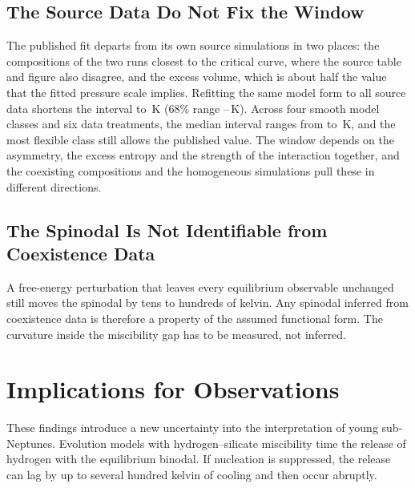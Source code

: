 \subsection{The Source Data Do Not Fix the Window}

The published fit departs from its own source simulations in two places: the compositions of
the two runs closest to the critical curve, where the source table and figure also disagree,
and the excess volume, which is about half the value that the fitted pressure scale implies.
Refitting the same model form to all source data shortens the interval to
\IntMOneTable{}\,K (68\% range \IntMOneTableLo{}--\IntMOneTableHi{}\,K). Across four smooth
model classes and six data treatments, the median interval ranges from \IntRangeLo{} to
\IntRangeHi{}\,K, and the most flexible class still allows the published value. The window
depends on the asymmetry, the excess entropy and the strength of the interaction together, and
the coexisting compositions and the homogeneous simulations pull these in different
directions.

\subsection{The Spinodal Is Not Identifiable from Coexistence Data}

A free-energy perturbation that leaves every equilibrium observable unchanged still moves the
spinodal by tens to hundreds of kelvin. Any spinodal inferred from coexistence data is
therefore a property of the assumed functional form. The curvature inside the miscibility gap
has to be measured, not inferred.

\section{Implications for Observations}

These findings introduce a new uncertainty into the interpretation of young sub-Neptunes.
Evolution models with hydrogen--silicate miscibility time the release of hydrogen with the
equilibrium binodal. If nucleation is suppressed, the release can lag by up to several hundred
kelvin of cooling and then occur abruptly.

